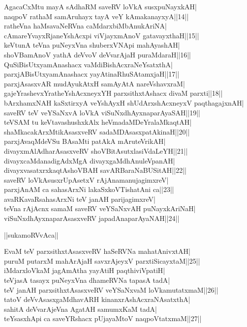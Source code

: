 \documentclass{article}
\begin{document}
AgacaCxMtu mayA sAdhaRM saveRV loVkA susxpuNayxkAH|\\
naqpoV rathaM samAruhayx tayA veY kAmakanayxyA||14||\\
ratheVna haMsavaNeRVna caMdarxbiMbAnukAriNA|\\
cAmareYvayxRjaneYshAcxpi viVjayxmAnoV gatavayxthaH||15||\\
keVtunA teVna puNeyxVna shuberxVNApi mahAyashAH|\\
shoVBamAnoV yathA deVvoV deVvarAjaH puraMdaraH||16||\\
QuSiBisUtxyamAnashacx vaMdiBishAcxraNeYsatxthA|\\
parxjABisUtxyamAnashacx yayAtinaRhuSAtamxjaH||17||\\
parxjAsasxvAR mudAyukAtxH samAyAtA nareVshavxraM|\\
gajeYrashevxYratheYshAcxneyxYH parxsithxtAshacx divaM parxti||18||\\
bArxhamxNAH kaSxtirxyA veYshAyxH shUdArxshAcxneyxV paqthagajxnAH|\\
saveRV teV veYSaNxvA loVkA viSuNxdhAyxnaparAyaSAH||19||\\
teVSAM tu keVtavashushxkAlx heVmadaMDeYralaMkaqtAH|\\
shaMkacakArxMtikAsasxveRV sadaMDAsasxpatAkinaH||20||\\
parxjAvaqMdeVSu BAsaMti patAkA mAruteVrikAH|\\
divayxmAlAdharAsasxveRV shoVBitAsutxlasiVdaLeYH||21||\\
divayxcaMdanadigAdxMgA divayxgaMdhAnuleVpanAH|\\
divayxvasatxrxkaqtAshoVBAH savARBaraNaBUSitAH||22||\\
saveRV loVkAsusxrUpAsetxV rAjAnamanujagimxreV|\\
parxjAnAM ca sahasArxNi lakaSxkoVTishatAni ca||23||\\
avaRKavaRsahasArxNi teV janAH parijagimxreV|\\
teVna rAjAcnx samaM saveRV veYSaNxvAH puNayxkAriNaH|\\
viSuNxdhAyxnaparAsasxveRV japadAnaparAyaNAH||24||\\

\begin{center}
||sukamoRVvAca||
\end{center}

EvaM teV parxsithxtAsasxveRV haSeRVNa mahatAnivxtAH|\\
puruM putarxM mahArAjaH savxrAjeyxV parxtiSicayxtaM||25||\\
iMdarxloVkaM jagAmAtha yayAtiH paqthiviVpatiH|\\
teVjasA tasayx puNeyxVna dhameRVNa tapasA tadA|\\
teV janAH parxsithxtAsasxveRV veYSaNxvaM loVkamutatxmaM||26||\\
tatoV deVvAsasxgaMdhavARH kinanxrAshAcxraNAsatxthA|\\
sahitA deVvarAjeVna AgatAH samumxKaM tadA|\\
teYsasxhApi ca saveYRshacx pUjayaMtoV naqpoVtatxmaM||27||\\
\end{document}
